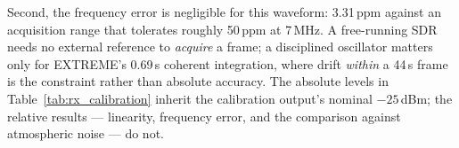 Second, the frequency error is negligible for this waveform: 3.31\,ppm
against an acquisition range that tolerates roughly 50\,ppm at 7\,MHz.
A free-running SDR needs no external reference to \emph{acquire} a
frame; a disciplined oscillator matters only for EXTREME's 0.69\,s
coherent integration, where drift \emph{within} a 44\,s frame is the
constraint rather than absolute accuracy.  The absolute levels in
Table~\ref{tab:rx_calibration} inherit the calibration output's nominal
$-25$\,dBm; the relative results --- linearity, frequency error, and
the comparison against atmospheric noise --- do not.

